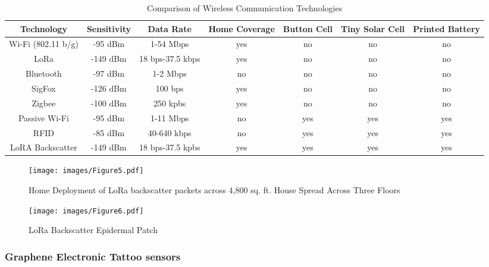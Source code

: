 \documentclass[sigconf]{acmart}
\begin{document}
\begin{table*}
  \caption{Comparison of Wireless Communication Technologies \cite{talla17}}
  \label{tab:freq}
  \begin{tabular}{ccccccc}
    \toprule
     Technology& Sensitivity& Data Rate& Home Coverage& Button Cell& Tiny Solar Cell& Printed Battery \\
    \midrule
    Wi-Fi (802.11 b/g)& -95 dBm& 1-54 Mbps& yes& no& no& no \\
    LoRa& -149 dBm& 18 bps-37.5 kbps& yes& no& no& no \\
    Bluetooth& -97 dBm& 1-2 Mbps& no& no& no& no \\
    SigFox& -126 dBm& 100 bps& yes& no& no& no \\
    Zigbee& -100 dBm& 250 kpbs& yes& no& no& no \\
    Passive Wi-Fi& -95 dBm& 1-11 Mbps& no& yes& yes& yes \\
    RFID& -85 dBm& 40-640 kbps& no& yes& yes& yes \\
    LoRA Backscatter& -149 dBm& 18 bps-37.5 kpbs& yes& yes& yes& yes \\
    \bottomrule
  \end{tabular}
\end{table*}

\begin{figure}[!ht]
  \centering\texttt{[image: images/Figure5.pdf]}
  \caption{Home Deployment of LoRa backscatter packets across 4,800 sq. ft.
  House Spread Across Three Floors \cite{talla17}
  }\label{f:Figure5}
\end{figure}

\begin{figure}[!ht]
  \centering\texttt{[image: images/Figure6.pdf]}
  \caption{LoRa Backscatter Epidermal Patch \cite{talla17}
  }\label{f:Figure6}
\end{figure}

\subsubsection{Graphene Electronic Tattoo sensors}
\end{document}
